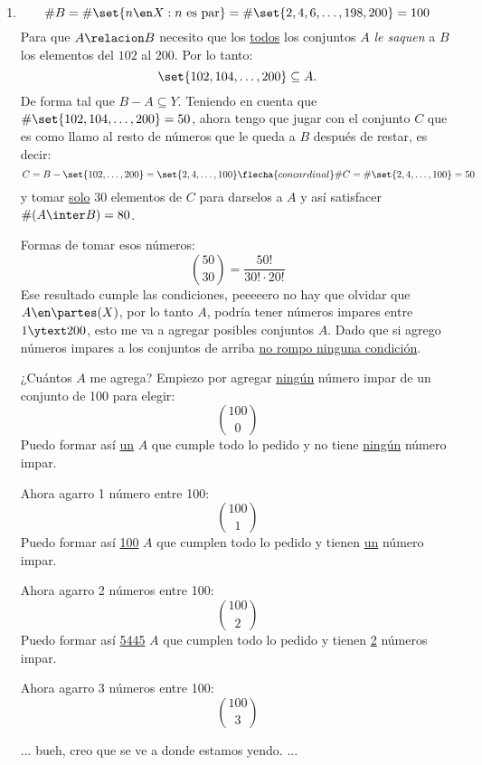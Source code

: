 \begin{enumerate}[label=\alph*)]
  \item
        $$
          \#B = \#\set{n \en X : n \text{ es par} } = \#\set{2,4,6,\dots,198,200} = 100
        $$
        Para que $A \relacion B$ necesito que los \underline{todos} los conjuntos $A$ \textit{le saquen} a $B$
        los elementos del $102$ al $200$. Por lo tanto:
        $$
          \set{102, 104, \dots, 200} \subseteq A.
        $$
        De forma tal que $B - A \subseteq Y$. Teniendo en cuenta que $\#\set{102, 104, \dots, 200} = 50$, ahora tengo que jugar con el
        conjunto $C$ que es como llamo al resto de números que le queda a $B$ después de restar, es decir:
        $$
          C =
          B - \set{102,\ldots,200} =
          \set{2, 4, \dots, 100}
          \flecha{con cardinal}
          \#C = \#\set{2, 4, \dots, 100} = 50
        $$
        y tomar \ul{solo} 30 elementos de $C$ para darselos a $A$ y así satisfacer $\#(A \inter B) = 80$.

        Formas de tomar esos números:
        $$
          \binom{50}{30} = \frac{50!}{30! \cdot 20!}
        $$
        Ese resultado cumple las condiciones, peeeeero no hay que olvidar que $A \en \partes(X)$,
        por lo tanto $A$, podría tener números impares entre $1 \ytext 200$, esto me va a agregar posibles conjuntos $A$. Dado
        que si agrego números impares a los conjuntos de arriba \underline{no rompo ninguna condición}.

        \medskip

        ¿Cuántos $A$ me agrega?
        Empiezo por agregar \underline{ningún} número impar de un conjunto de 100 para elegir:
        $$
          \binom{100}{0}
        $$
        Puedo formar así \underline{un} $A$ que cumple todo lo pedido y no tiene \underline{ningún} número impar.

        Ahora agarro 1 número entre 100:
        $$
          \binom{100}{1}
        $$
        Puedo formar así \underline{100} $A$ que cumplen todo lo pedido y tienen \underline{un} número impar.

        Ahora agarro 2 números entre 100:
        $$
          \binom{100}{2}
        $$
        Puedo formar así \underline{5445} $A$ que cumplen todo lo pedido y tienen \underline{2} números impar.

        Ahora agarro 3 números entre 100:
        $$
          \binom{100}{3}
        $$

        \bigskip

        \begin{center}
          ...
          bueh, creo que se ve a donde estamos yendo.
          ...
        \end{center}


\end{enumerate}
